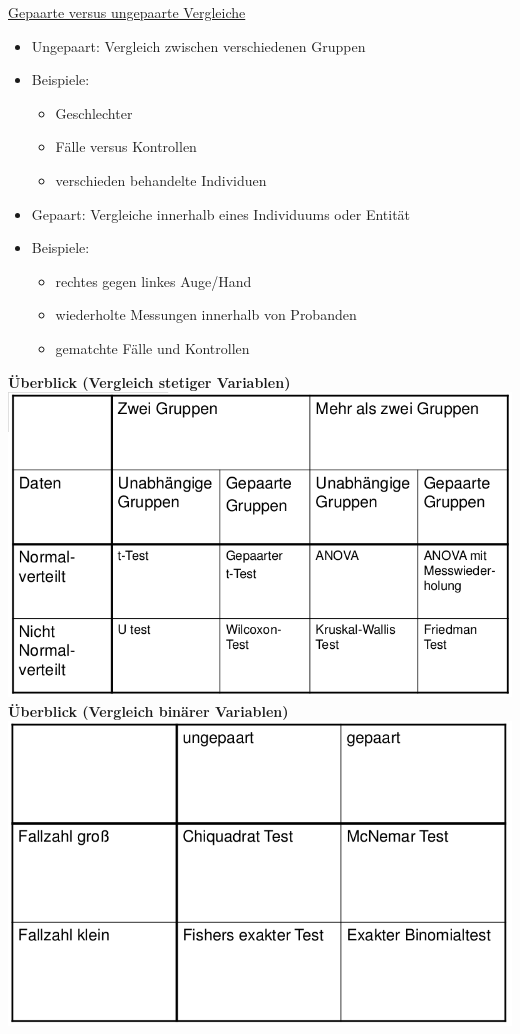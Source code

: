 \underline{Gepaarte versus ungepaarte Vergleiche}
\begin{itemize}
	\item Ungepaart: Vergleich zwischen verschiedenen Gruppen
	\item Beispiele:
	\begin{itemize}
		\item Geschlechter
		\item Fälle versus Kontrollen
		\item verschieden behandelte Individuen
	\end{itemize}
	\item Gepaart: Vergleiche innerhalb eines Individuums oder Entität
	\item Beispiele:
	\begin{itemize}
		\item rechtes gegen linkes Auge/Hand
		\item wiederholte Messungen innerhalb von Probanden
		\item gematchte Fälle und Kontrollen
	\end{itemize}
\end{itemize}

\textbf{Überblick (Vergleich stetiger Variablen)}\\
\includegraphics[width=1.00\textwidth]{lectures/V5/pix/stet_var.png}
\\
\textbf{Überblick (Vergleich binärer Variablen)}\\
\includegraphics[width=1.00\textwidth]{lectures/V5/pix/bin_var.png}

